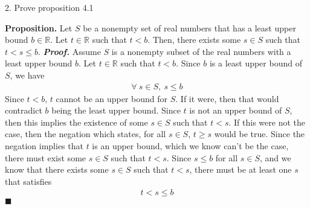 \documentclass{report}
\begin{document}
    \bigbreak \noindent 
    \begin{mdframed}
        2. Prove proposition 4.1
    \end{mdframed}
    \bigbreak \noindent 
    \textbf{Proposition.} Let $S$ be a nonempty set of real numbers that has a least upper bound $b \in \mathbb{R}$. Let $t \in \mathbb{R}$ such that $t < b$. Then, there exists some $s \in S$ such that $t < s \leq b$.
    \bigbreak \noindent 
    \textbf{\textit{Proof.}} Assume $S$ is a nonempty subset of the real numbers with a least upper bound $b$. Let $t\in \mathbb{R}$ such that $t<b$. Since $b$ is a least upper bound of $S$, we have
    \begin{align*}
        \forall \ s \in S,\ s \leq b 
    \end{align*}
    Since $t< b$, $t$ cannot be an upper bound for $S$. If it were, then that would contradict $b$ being the least upper bound. Since $t$ is not an upper bound of $S$, then this implies the existence of some $s\in S$ such that $ t< s$. If this were not the case, then the negation which states, for all $s\in S$, $t \geq s$ would be true. Since the negation implies that $t$ is an upper bound, which we know can't be the case, there must exist some $s\in S$ such that $t < s$. 
    \bigbreak \noindent 
    Since $s \leq b$ for all $s\in S$, and we know that there exists some $s \in S$ such that $t < s$, there must be at least one $s$ that satisfies
    \begin{align*}
        t < s \leq b
    \end{align*}
    \hspace*{\fill} $\blacksquare$
\end{document}
